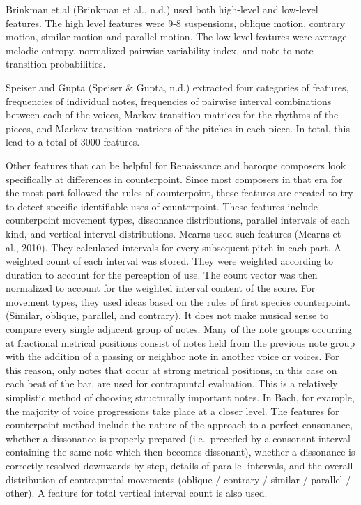 \documentclass[12pt,twoside]{reedthesis}
\theoremstyle{definition}
\theoremstyle{definition}
\theoremstyle{definition}
\theoremstyle{remark}
\begin{document}
Brinkman et.al (Brinkman et al., n.d.) used both high-level and
low-level features. The high level features were 9-8 suspensions,
oblique motion, contrary motion, similar motion and parallel motion. The
low level features were average melodic entropy, normalized pairwise
variability index, and note-to-note transition probabilities.

Speiser and Gupta (Speiser \& Gupta, n.d.) extracted four categories of
features, frequencies of individual notes, frequencies of pairwise
interval combinations between each of the voices, Markov transition
matrices for the rhythms of the pieces, and Markov transition matrices
of the pitches in each piece. In total, this lead to a total of 3000
features.

Other features that can be helpful for Renaissance and baroque composers
look specifically at differences in counterpoint. Since most composers
in that era for the most part followed the rules of counterpoint, these
features are created to try to detect specific identifiable uses of
counterpoint. These features include counterpoint movement types,
dissonance distributions, parallel intervals of each kind, and vertical
interval distributions. Mearns used such features (Mearns et al., 2010).
They calculated intervals for every subsequent pitch in each part. A
weighted count of each interval was stored. They were weighted according
to duration to account for the perception of use. The count vector was
then normalized to account for the weighted interval content of the
score. For movement types, they used ideas based on the rules of first
species counterpoint. (Similar, oblique, parallel, and contrary). It
does not make musical sense to compare every single adjacent group of
notes. Many of the note groups occurring at fractional metrical
positions consist of notes held from the previous note group with the
addition of a passing or neighbor note in another voice or voices. For
this reason, only notes that occur at strong metrical positions, in this
case on each beat of the bar, are used for contrapuntal evaluation. This
is a relatively simplistic method of choosing structurally important
notes. In Bach, for example, the majority of voice progressions take
place at a closer level. The features for counterpoint method include
the nature of the approach to a perfect consonance, whether a dissonance
is properly prepared (i.e.~preceded by a consonant interval containing
the same note which then becomes dissonant), whether a dissonance is
correctly resolved downwards by step, details of parallel intervals, and
the overall distribution of contrapuntal movements (oblique / contrary /
similar / parallel / other). A feature for total vertical interval count
is also used.
\end{document}
